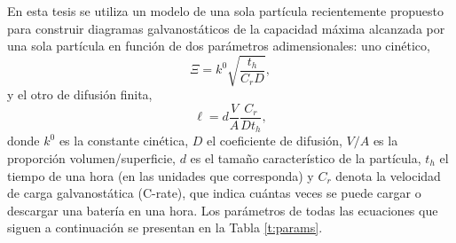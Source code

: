 En esta tesis se utiliza un modelo de una sola partícula recientemente propuesto 
\cite{gavilan2023} para construir diagramas galvanostáticos de la capacidad máxima 
alcanzada por una sola partícula en función de dos parámetros adimensionales: uno
cinético,
\begin{equation}\label{eq:xi}
    \Xi = k^0 \sqrt{\frac{t_h}{C_r D}},
\end{equation}
y el otro de difusión finita,
\begin{equation}\label{eq:ele}
    \ell = d \frac{V}{A} \frac{C_r}{D t_h},
\end{equation}
donde $k^0$ es la constante cinética, $D$ el coeficiente de difusión, $V/A$ es la 
proporción volumen/superficie, $d$ es el tamaño característico de la partícula, 
$t_h$ el tiempo de una hora (en las unidades que corresponda) y $C_r$ denota la 
velocidad de carga galvanostática (C-rate), que indica cuántas veces se puede 
cargar o descargar una batería en una hora. Los parámetros de todas las ecuaciones 
que siguen a continuación se presentan en la Tabla \ref{t:params}.
